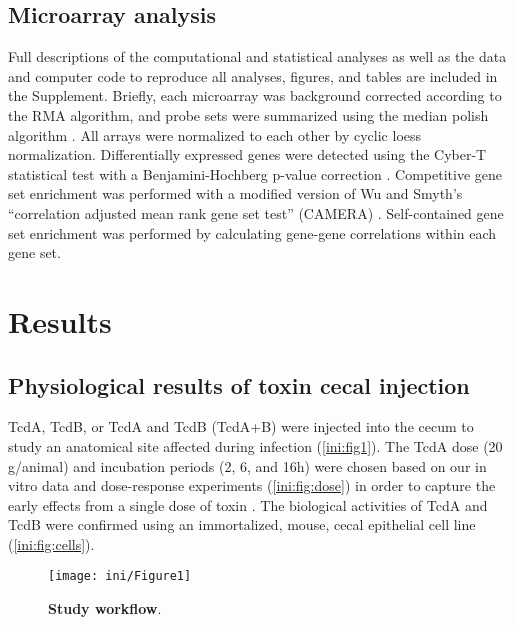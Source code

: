 \subsection{ Microarray analysis }
\label{ini:methods:bioinformatics}
Full descriptions of the computational and statistical analyses as well as the 
data and computer code to reproduce all analyses, figures, and tables are 
included in the Supplement. Briefly, each microarray was background corrected 
according to the RMA algorithm, and probe sets were summarized using the 
median polish algorithm \cite{Irizarry:2003ge}. All arrays were normalized 
to each other by cyclic loess normalization. Differentially expressed genes 
were detected using the Cyber-T statistical test with a Benjamini-Hochberg 
p-value correction \cite{Baldi:2001ul}. Competitive gene set enrichment 
was performed with a modified version of Wu and Smyth's ``correlation 
adjusted mean rank gene set test'' (CAMERA) \cite{Wu:2012kp}. Self-contained 
gene set enrichment was performed by calculating gene-gene correlations 
within each gene set.

\section{Results}

\subsection{ Physiological results of toxin cecal injection }
TcdA, TcdB, or TcdA and TcdB (TcdA+B) were injected into the cecum 
to study an anatomical site affected during infection (\autoref{ini:fig1}). 
The TcdA dose (20 \textmugreek{}g/animal) and incubation periods (2, 6, and 
16h) were chosen based on our in vitro data and dose-response experiments 
(\autoref{ini:fig:dose}) in order to capture the early effects from a 
single dose of toxin \cite{DAuria:2012bd}. The biological activities 
of TcdA and TcdB were confirmed using an immortalized, mouse, cecal 
epithelial cell line (\autoref{ini:fig:cells}).

\begin{figure}[h!]
  \centering
  \texttt{[image: ini/Figure1]}
  \caption[Study workflow]{
       \textbf{Study workflow}.
  }
  \label{ini:fig1}
\end{figure}

